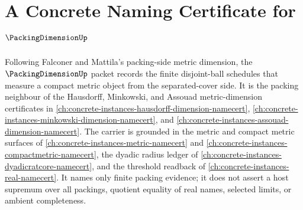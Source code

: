 \chapter{A Concrete Naming Certificate for $\PackingDimensionUp$}
\label{ch:concrete-instances-packing-dimension-namecert}

Following Falconer and Mattila's packing-side metric dimension, the
$\PackingDimensionUp$ packet records the finite disjoint-ball schedules that
measure a compact metric object from the separated-cover side. It is the
packing neighbour of the Hausdorff, Minkowski, and Assouad metric-dimension
certificates in
\autoref{ch:concrete-instances-hausdorff-dimension-namecert},
\autoref{ch:concrete-instances-minkowski-dimension-namecert}, and
\autoref{ch:concrete-instances-assouad-dimension-namecert}. The carrier is
grounded in the metric and compact metric surfaces of
\autoref{ch:concrete-instances-metric-namecert} and
\autoref{ch:concrete-instances-compactmetric-namecert}, the dyadic radius
ledger of \autoref{ch:concrete-instances-dyadicratcore-namecert}, and the
threshold readback of \autoref{ch:concrete-instances-real-namecert}. It names
only finite packing evidence; it does not assert a host supremum over all
packings, quotient equality of real names, selected limits, or ambient
completeness.

